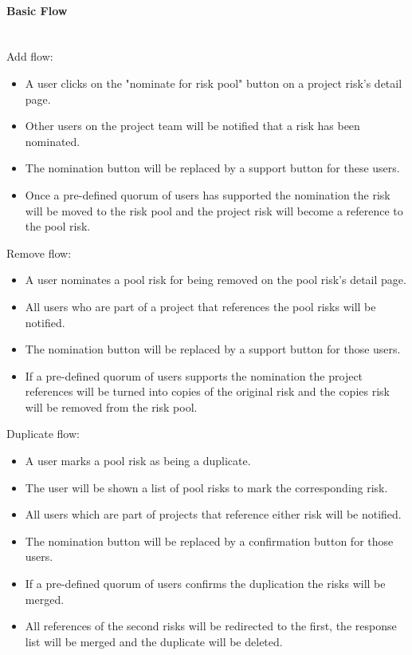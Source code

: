 \paragraph*{Basic Flow} \mbox{}\\
Add flow:
\begin{itemize}
	\vspace{-3mm}
	\setlength\itemsep{-1em}
	\item A user clicks on the "nominate for risk pool" button on a project risk's detail page.
	\item Other users on the project team will be notified that a risk has been nominated.
	\item The nomination button will be replaced by a support button for these users.
	\item Once a pre-defined quorum of users has supported the nomination the risk will be moved to the risk pool and the project risk will become a reference to the pool risk.
\end{itemize}

Remove flow:
\begin{itemize}
	\vspace{-3mm}
	\setlength\itemsep{-1em}
	\item A user nominates a pool risk for being removed on the pool risk's detail page.
	\item All users who are part of a project that references the pool risks will be notified.
	\item The nomination button will be replaced by a support button for those users.
	\item If a pre-defined quorum of users supports the nomination the project references will be turned into copies of the original risk and the copies risk will be removed from the risk pool.
\end{itemize}

Duplicate flow:
\begin{itemize}
	\vspace{-3mm}
	\setlength\itemsep{-1em}
	\item A user marks a pool risk as being a duplicate.
	\item The user will be shown a list of pool risks to mark the corresponding risk.
	\item All users which are part of projects that reference either risk will be notified.
	\item The nomination button will be replaced by a confirmation button for those users.
	\item If a pre-defined quorum of users confirms the duplication the risks will be merged.
	\item All references of the second risks will be redirected to the first, the response list will be merged and the duplicate will be deleted.
\end{itemize}

